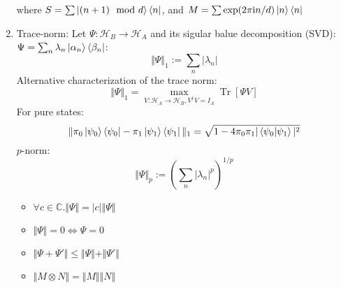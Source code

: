 \documentclass[11pt,a4paper]{article}%
\numberwithin{equation}{section}
\newcommand\mi{\mathrm{i}}
\newcommand{\Tr}{\operatorname{Tr}}
\begin{document}
\begin{enumerate}
\begin{equation}
    \end{equation}
    where $S = \sum \ket{(n+1)\mod d}\bra n$, and $M = \sum \exp (2\pi\mi n/d)\ket n\bra n$
    \item Trace-norm: Let $\Psi: \mathcal H_B \to \mathcal H_A$ and its sigular balue decomposition (SVD): $\Psi = \sum_n\lambda_n\ket{\alpha_n}\bra{\beta_n}$:
    \begin{equation}
        \Vert \Psi \Vert_1 := \sum_n|\lambda_n|
    \end{equation}
    Alternative characterization of the trace norm:
    \begin{equation}
        \Vert\Psi\Vert_1 = \max_{V:\mathcal H_A\to\mathcal H_B , V^\dagger V = I_A}\Tr[\Psi V]
    \end{equation}
    For pure states:
    \begin{equation}
        \Vert \pi_0\ket{\psi_0}\bra{\psi_0} - \pi_1\ket{\psi_1}\bra{\psi_1}\Vert_1 = \sqrt{1-4\pi_0\pi_1|\braket{\psi_0|\psi_1}|^2}
    \end{equation}
    $p$-norm:
    \begin{equation}
        \Vert \Psi \Vert_p := \left(\sum_n |\lambda_n|^p\right)^{1/p}
    \end{equation}
    \begin{itemize}
        \item $\forall c\in\mathbb C.\Vert\Psi\Vert = |c|\Vert\Psi\Vert$
        \item $\Vert\Psi\Vert = 0\Leftrightarrow \Psi = 0$
        \item $\Vert\Psi + \Psi'\Vert\le\Vert\Psi\Vert + \Vert\Psi'\Vert$
        \item $\Vert M\otimes N\Vert = \Vert M\Vert \Vert N\Vert$ 
    \end{itemize}
\end{enumerate}
\end{document}
